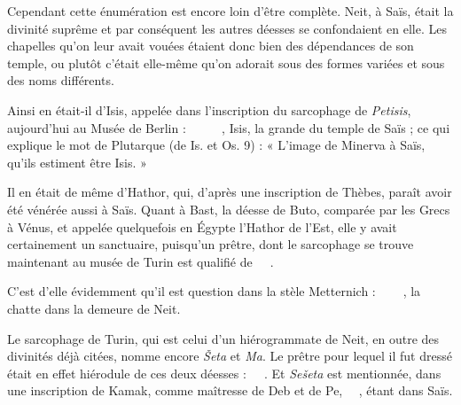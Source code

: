 \documentclass[a4paper, 11pt, oneside]{article}
\newcommand*\hieroglyhicsAAAD{}
\newcommand*\hieroglyhicsAAAH{}
\newcommand*\hieroglyhicsAAAI{}
\newcommand*\hieroglyhicsAAAW{\raisebox{0.5ex}{}}
\newcommand*\hieroglyhicsAACB{\raisebox{0.5ex}{}}
\newcommand*\hieroglyhicsAACM{}
\newcommand*\hieroglyhicsAACN{\raisebox{1ex}{}}
\newcommand*\hieroglyhicsAADC{\raisebox{0.5ex}{}}
\newcommand*\hieroglyhicsAADV{\raisebox{0.5ex}{}}
\newcommand*\hieroglyhicsAAEK{}
\newcommand*\hieroglyhicsAAFQ{}
\newcommand*\hieroglyhicsAAHC{}
\newcommand*\hieroglyhicsAAHK{}
\newcommand*\hieroglyhicsAAHL{}
\newcommand*\hieroglyhicsAAHW{}
\newcommand*\hieroglyhicsAAHY{}
\newcommand*\hieroglyhicsAAII{}
\newcommand*\hieroglyhicsAAIJ{}
\newcommand*\hieroglyhicsAAIK{}
\newcommand*\hieroglyhicsAAIL{}
\newcommand*\hieroglyhicsAAIM{}
\newcommand*\hieroglyhicsAAIN{}
\newcommand*\hieroglyhicsAAIO{}
\newcommand*\hieroglyhicsAAIP{}
\newcommand*\hieroglyhicsAAIQ{}
\newcommand*\hieroglyhicsAAIR{}
\newcommand*\hieroglyhicsAAIS{}
\newcommand*\hieroglyhicsAAIT{}
\newcommand*\hieroglyhicsAAIU{}
\newcommand*\hieroglyhicsAAIV{}
\newcommand*\hieroglyhicsAAIW{}
\begin{document}
Cependant cette énumération est encore loin d'être complète. Neit, à Saïs, était la divinité suprême et par conséquent les autres déesses se confondaient en elle. Les chapelles qu'on leur avait vouées étaient donc bien des dépendances de son temple, ou plutôt c'était elle-même qu'on adorait sous des formes variées et sous des noms différents.

Ainsi en était-il d'Isis, appelée dans l'inscription du sarcophage de \emph{Petisis}, aujourd'hui au Musée de Berlin : $\hieroglyhicsAAHY\:\hieroglyhicsAAII\:\hieroglyhicsAAIJ\allowbreak\:\hieroglyhicsAAIK\:\hieroglyhicsAAFQ\:\hieroglyhicsAACB\allowbreak\:\hieroglyhicsAAIL\:\hieroglyhicsAAEK\:\hieroglyhicsAAHK\allowbreak\:\hieroglyhicsAAIM\:\hieroglyhicsAAAI\:\hieroglyhicsAAIN$, Isis, la grande du temple de Saïs ; ce qui explique le mot de Plutarque (de Is. et Os. 9) : « L'image de Minerva à Saïs, qu'ils estiment être Isis. »

Il en était de même d'Hathor, qui, d'après une inscription de Thèbes, paraît avoir été vénérée aussi à Saïs. Quant à Bast, la déesse de Buto, comparée par les Grecs à Vénus, et appelée quelquefois en Égypte l'Hathor de l'Est, elle y avait certainement un sanctuaire, puisqu’un prêtre, dont le sarcophage se trouve maintenant au musée de Turin est qualifié de $\hieroglyhicsAAEK\:\hieroglyhicsAAHC\:\hieroglyhicsAAIO\allowbreak\:\hieroglyhicsAAIP\:\hieroglyhicsAAIQ\:\hieroglyhicsAAIR$.

C'est d'elle évidemment qu'il est question dans la stèle Metternich : $\hieroglyhicsAAIS\:\hieroglyhicsAAAH\:\hieroglyhicsAACM\allowbreak\:\hieroglyhicsAACB\:\hieroglyhicsAAIT\:\hieroglyhicsAADV\allowbreak\:\hieroglyhicsAAIU\:\hieroglyhicsAACN\:\hieroglyhicsAAHL$, la chatte dans la demeure de Neit.

Le sarcophage de Turin, qui est celui d'un hiérogrammate de Neit, en outre des divinités déjà citées, nomme encore \emph{Šeta} et \emph{Ma}. Le prêtre pour lequel il fut dressé était en effet hiérodule de ces deux déesses : $\hieroglyhicsAAEK\:\hieroglyhicsAAHC\:\hieroglyhicsAAIV\allowbreak\:\hieroglyhicsAAEK\:\hieroglyhicsAAHC\:\hieroglyhicsAAIW$. Et \emph{Sešeta} est mentionnée, dans une inscription de Kamak, comme maîtresse de Deb et de Pe, $\hieroglyhicsAAHW\:\hieroglyhicsAACB\:\hieroglyhicsAAAD\allowbreak\:\hieroglyhicsAADC\:\hieroglyhicsAAAW$, étant dans Saïs.
\end{document}
